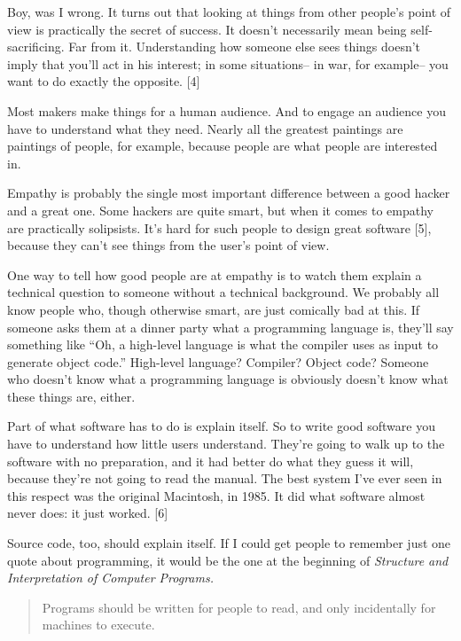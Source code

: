 Boy, was I wrong.  It turns out that looking at things from 
other people's point of view is practically the secret of
success.  It doesn't necessarily mean being self-sacrificing.
Far from it.  Understanding how someone else sees things
doesn't imply that you'll act in his interest; in some
situations-- in war, for example-- you want to do exactly
the opposite. [4]

Most makers make things for a human audience.
And to engage an audience you have to understand what they need.
Nearly all the greatest paintings are paintings of people,
for example, because people are what people are interested in.

Empathy is probably the single most important difference
between a good hacker and a great one.  Some hackers
are quite smart, but when it comes to empathy are
practically solipsists.  It's hard for such      
people to design great software [5], because they can't
see things from the user's point of view.

One way to tell how good people are at empathy is to watch
them explain a technical question to someone without a technical
background.  We probably all know people who, though otherwise smart,
are just comically bad at this.  If someone asks them at
a dinner party what a programming language is, they'll
say something like ``Oh, a high-level language is what
the compiler uses as input to generate object code.''
High-level language?  Compiler?  Object code?  Someone who 
doesn't know what a programming language is obviously doesn't
know what these things are, either.

Part of what software has to do is explain itself.  So to   
write good software you have to understand how little users   
understand.
They're going to walk up to the software with no preparation, and
it had better do what they guess it will, because they're
not going to read the manual.  The best system I've ever seen 
in this respect was the original Macintosh, in 1985.
It did what software almost never does: it just worked. [6]

Source code, too, should explain itself.  If I could get people to
remember just one quote about programming, it would be the
one at the beginning of \emph{Structure and Interpretation of Computer
Programs.}  
\begin{quote}

Programs should be written for people to read, and
only incidentally for machines to execute.

\end{quote}

